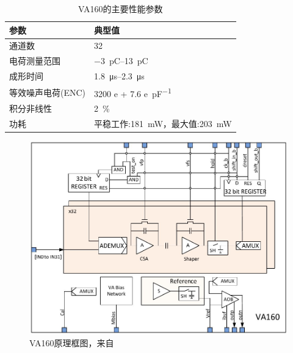 \begin{table}[h]
	\centering
	\caption{VA160的主要性能参数}
	\label{tab:ch2:va160}
	
	\begin{tabulary}{0.7\linewidth}{Ll}
		\toprule[1.5pt]
		\textbf{参数} &                     \textbf{典型值}                       \\ 
		\midrule[1pt]
		通道数         &                          32                            \\
		电荷测量范围      &           \SIrange{-3}{13}{\pico\coulomb}            \\
		成形时间        &          \SIrange{1.8}{2.3}{\micro\second}            \\
		等效噪声电荷(ENC) &       3200 \si{e} + 7.6 \si{e\per\pico\farad}          \\
		积分非线性       &                   \SI{2}{\percent}                     \\
		功耗          & 平稳工作:\SI{181}{\milli\watt}，最大值:\SI{203}{\milli\watt}   \\ 
		\bottomrule[1.5pt]
	\end{tabulary}
\end{table}

\begin{figure}[h!]
	\centering
	\includegraphics[width=0.8\linewidth]{chap/description/fig/va160}
	\caption{VA160原理框图，来自~\parencite{fengchangqing_eqm}}
	\label{fig:ch2:va160}
\end{figure}

